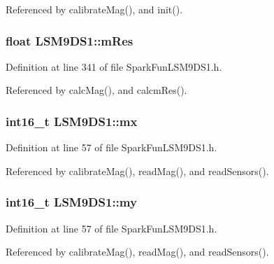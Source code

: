 Referenced by calibrate\+Mag(), and init().

\subsubsection[{\texorpdfstring{m\+Res}{mRes}}]{\setlength{\rightskip}{0pt plus 5cm}float L\+S\+M9\+D\+S1\+::m\+Res\hspace{0.3cm}{\ttfamily [protected]}}\hypertarget{class_l_s_m9_d_s1_aac7ae43adf399e8052464b966aec8472}{}\label{class_l_s_m9_d_s1_aac7ae43adf399e8052464b966aec8472}


Definition at line 341 of file Spark\+Fun\+L\+S\+M9\+D\+S1.\+h.



Referenced by calc\+Mag(), and calcm\+Res().

\subsubsection[{\texorpdfstring{mx}{mx}}]{\setlength{\rightskip}{0pt plus 5cm}int16\+\_\+t L\+S\+M9\+D\+S1\+::mx}\hypertarget{class_l_s_m9_d_s1_a0e68eb9e44969070b6d84a93ba252f71}{}\label{class_l_s_m9_d_s1_a0e68eb9e44969070b6d84a93ba252f71}


Definition at line 57 of file Spark\+Fun\+L\+S\+M9\+D\+S1.\+h.



Referenced by calibrate\+Mag(), read\+Mag(), and read\+Sensors().

\subsubsection[{\texorpdfstring{my}{my}}]{\setlength{\rightskip}{0pt plus 5cm}int16\+\_\+t L\+S\+M9\+D\+S1\+::my}\hypertarget{class_l_s_m9_d_s1_a773f80f9b7cdf8375c84a4209895d732}{}\label{class_l_s_m9_d_s1_a773f80f9b7cdf8375c84a4209895d732}


Definition at line 57 of file Spark\+Fun\+L\+S\+M9\+D\+S1.\+h.



Referenced by calibrate\+Mag(), read\+Mag(), and read\+Sensors().

